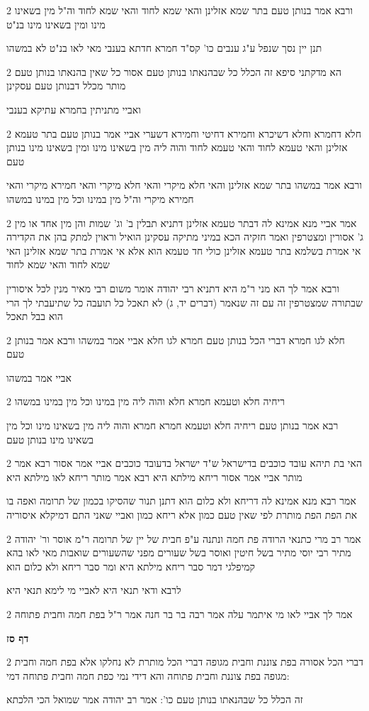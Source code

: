 \documentclass[12pt, openany]{book}
\newcommand{\sethebfont}{
\fontsize{10.5pt}{21.0pt} \selectfont
}
\newcommand{\twocol}[1]{
	{\sethebfont \begin{multicols}{2}
			#1
	\end{multicols}}	
}
\newcommand{\sectname}{}
\newcommand{\newsection}[1]{
	\addcontentsline{toc}{section}{#1}
	\renewcommand{\sectname}{#1}	
	\vspace{-\baselineskip}
	\begin{center}
		\textbf{%
\fontsize{16pt}{16pt}\selectfont
			#1}
	\end{center}
	\vspace{-\baselineskip}
	\nopagebreak
}
\begin{document}
\twocol{ורבא אמר בנותן טעם בתר שמא אזלינן והאי שמא לחוד והאי שמא לחוד וה"ל מין בשאינו מינו ומין בשאינו מינו בנ"ט
\par תנן יין נסך שנפל ע"ג ענבים כו' קס"ד חמרא חדתא בענבי מאי לאו בנ"ט לא במשהו}
\twocol{הא מדקתני סיפא זה הכלל כל שבהנאתו בנותן טעם אסור כל שאין בהנאתו בנותן טעם מותר מכלל דבנותן טעם עסקינן
\par ואביי מתניתין בחמרא עתיקא בענבי}
\twocol{חלא דחמרא וחלא דשיכרא וחמירא דחיטי וחמירא דשערי אביי אמר בנותן טעם בתר טעמא אזלינן והאי טעמא לחוד והאי טעמא לחוד והוה ליה מין בשאינו מינו ומין בשאינו מינו בנותן טעם
\par ורבא אמר במשהו בתר שמא אזלינן והאי חלא מיקרי והאי חלא מיקרי והאי חמירא מיקרי והאי חמירא מיקרי וה"ל מין במינו וכל מין במינו במשהו}
\twocol{אמר אביי מנא אמינא לה דבתר טעמא אזלינן דתניא תבלין ב' וג' שמות והן מין אחד או מין ג' אסורין ומצטרפין ואמר חזקיה הכא במיני מתיקה עסקינן הואיל וראוין למתק בהן את הקדירה אי אמרת בשלמא בתר טעמא אזלינן כולי חד טעמא הוא אלא אי אמרת בתר שמא אזלינן האי שמא לחוד והאי שמא לחוד
\par ורבא אמר לך הא מני ר"מ היא דתניא רבי יהודה אומר משום רבי מאיר מנין לכל איסורין שבתורה שמצטרפין זה עם זה שנאמר (דברים יד, ג) לא תאכל כל תועבה כל שתיעבתי לך הרי הוא בבל תאכל}
\twocol{חלא לגו חמרא דברי הכל בנותן טעם חמרא לגו חלא אביי אמר במשהו ורבא אמר בנותן טעם
\par אביי אמר במשהו}
\twocol{ריחיה חלא וטעמא חמרא חלא והוה ליה מין במינו וכל מין במינו במשהו
\par רבא אמר בנותן טעם ריחיה חלא וטעמא חמרא חמרא והוה ליה מין בשאינו מינו וכל מין בשאינו מינו בנותן טעם}
\twocol{האי בת תיהא עובד כוכבים בדישראל ש"ד ישראל בדעובד כוכבים אביי אמר אסור רבא אמר מותר אביי אמר אסור ריחא מילתא היא רבא אמר מותר ריחא לאו מילתא היא
\par אמר רבא מנא אמינא לה דריחא ולא כלום הוא דתנן תנור שהסיקו בכמון של תרומה ואפה בו את הפת הפת מותרת לפי שאין טעם כמון אלא ריחא כמון ואביי שאני התם דמיקלא איסוריה}
\twocol{אמר רב מרי כתנאי הרודה פת חמה ונתנה ע"פ חבית של יין של תרומה ר"מ אוסר ור' יהודה מתיר רבי יוסי מתיר בשל חיטין ואוסר בשל שעורים מפני שהשעורים שואבות מאי לאו בהא קמיפלגי דמר סבר ריחא מילתא היא ומר סבר ריחא ולא כלום הוא
\par לרבא ודאי תנאי היא לאביי מי לימא תנאי היא}
\twocol{אמר לך אביי לאו מי איתמר עלה אמר רבה בר בר חנה אמר ר"ל בפת חמה וחבית פתוחה}
\newsection{דף סז}
\twocol{דברי הכל אסורה בפת צוננת וחבית מגופה דברי הכל מותרת לא נחלקו אלא בפת חמה וחבית מגופה בפת צוננת וחבית פתוחה והא דידי נמי כפת חמה וחבית פתוחה דמי:
\par זה הכלל כל שבהנאתו בנותן טעם כו': אמר רב יהודה אמר שמואל הכי הלכתא}
\end{document}
